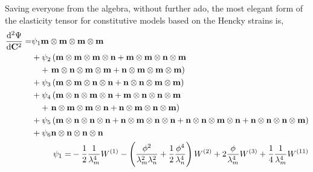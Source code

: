 	Saving everyone from the algebra, without further ado, the most elegant form of the elasticity tensor for constitutive models based on the Hencky strains is, 
\begin{subequations} \label{eqn:elasticityhencky}
\begin{align}
\begin{split}
\dod[2]{\Psi}{\mathbf{C}} =&
	\psi_1 \mathbf{m}\otimes\mathbf{m}\otimes\mathbf{m}\otimes\mathbf{m}	\\
    &+ \psi_2
    	\left(
        	\mathbf{m}\otimes\mathbf{m}\otimes\mathbf{m}\otimes\mathbf{n}
            +\mathbf{m}\otimes\mathbf{m}\otimes\mathbf{n}\otimes\mathbf{m} \right. \\
            &\quad +\left. \mathbf{m}\otimes\mathbf{n}\otimes\mathbf{m}\otimes\mathbf{m}
            +\mathbf{n}\otimes\mathbf{m}\otimes\mathbf{m}\otimes\mathbf{m}
        \right)	\\
    &+ \psi_3
    	\left(
        	\mathbf{m}\otimes\mathbf{m}\otimes\mathbf{n}\otimes\mathbf{n}
            +\mathbf{n}\otimes\mathbf{n}\otimes\mathbf{m}\otimes\mathbf{m}
        \right)	\\
    &+ \psi_4
    	\left(
        	\mathbf{m}\otimes\mathbf{n}\otimes\mathbf{m}\otimes\mathbf{n}
            +\mathbf{m}\otimes\mathbf{n}\otimes\mathbf{n}\otimes\mathbf{m} \right. \\
            &\quad +\left.\mathbf{n}\otimes\mathbf{m}\otimes\mathbf{m}\otimes\mathbf{n}
            +\mathbf{n}\otimes\mathbf{m}\otimes\mathbf{n}\otimes\mathbf{m}
        \right)	\\
    &+ \psi_5
    	\left(
        	\mathbf{m}\otimes\mathbf{n}\otimes\mathbf{n}\otimes\mathbf{n}
            +\mathbf{n}\otimes\mathbf{m}\otimes\mathbf{n}\otimes\mathbf{n}
            +\mathbf{n}\otimes\mathbf{n}\otimes\mathbf{m}\otimes\mathbf{n}
            +\mathbf{n}\otimes\mathbf{n}\otimes\mathbf{n}\otimes\mathbf{m}
        \right)	\\
    &+ \psi_6 \mathbf{n}\otimes\mathbf{n}\otimes\mathbf{n}\otimes\mathbf{n}
\end{split}	\\
\begin{split}
\psi_1 =&
        -\frac{1}{2}\frac{1}{\lambda_m^4}W^{(1)}
        -\left(\frac{\phi^2}{\lambda_m^2\lambda_n^2}+\frac{1}{2}\frac{\phi^4}{\lambda_n^4}\right)W^{(2)}
        +2\frac{\phi}{\lambda_m^4}W^{(3)}
        +\frac{1}{4}\frac{1}{\lambda_m^4}W^{(11)}   \\

\end{split}
\end{align}
\end{subequations}
